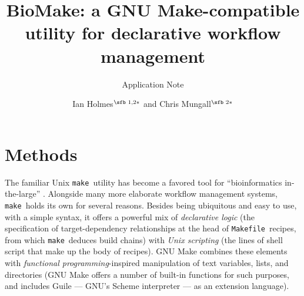 \documentclass{bioinfo}
\newcommand\Makefile{{\tt Makefile}}
\newcommand\make{{\tt make}}
\begin{document}

\subtitle{Application Note}

\title[BioMake: declarative workflow management]{BioMake: a GNU Make-compatible utility for declarative workflow management}
\author[Ian Holmes and Chris Mungall]{Ian Holmes$^{\text{\sfb 1,2}*}$ and Chris Mungall$^{\text{\sfb 2}*}$}
\address{$^{\text{\sf 1}}$Department of Bioengineering, University of California, Berkeley, CA 94720, USA and \\
$^{\text{\sf 2}}$Lawrence Berkeley National Laboratory, 1 Cyclotron Rd, Berkeley, CA 94720, USA.}


\history{}

\editor{}


\maketitle

\section*{Methods}

The familiar Unix \make\ utility has become a favored tool for ``bioinformatics in-the-large'' \citep{ParkerGorlickLee2003}.
Alongside many more elaborate workflow management systems, \make\ holds its own for several reasons.
Besides being ubiquitous and easy to use, with a simple syntax, it offers a powerful mix
of {\em declarative logic} (the specification of target-dependency relationships at the head of \Makefile\ recipes, from which \make\ deduces build chains)
with {\em Unix scripting} (the lines of shell script that make up the body of recipes).
GNU Make combines these elements with {\em functional programming}-inspired manipulation of text variables, lists, and directories
(GNU Make offers a number of built-in functions for such purposes, and includes Guile --- GNU's Scheme interpreter --- as an extension language).
\end{document}
